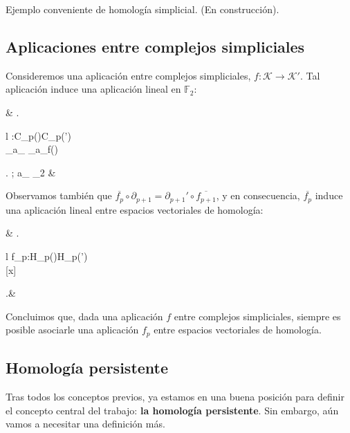 \documentclass[12pt]{article}
\numberwithin{equation}{section}
\theoremstyle{definition}
\newenvironment{ejem}
  {\pushQED{\qed}\renewcommand{\qedsymbol}{$\blacktriangleleft$}\ejemplo}
  {\popQED\endejemplo}
\theoremstyle{remark}
\theoremstyle{plain}
\begin{document}
		\begin{ejem}
			Ejemplo conveniente de homología simplicial. (En construcción).
		\end{ejem}	

	\subsection{Aplicaciones entre complejos simpliciales}

		Consideremos una aplicación entre complejos simpliciales, $f:\mathcal{K}\rightarrow\mathcal{K}'$. Tal aplicación induce una aplicación lineal en $\mathbb{F}_{2}$:
		\begin{flalign*}
			& \left.
			\begin{array}{l}
				:C_{p}()\rightarrow C_{p}(')\\[2pt] 
				\hspace{0.45cm} \displaystyle \sum_{}a_{\sigma}\sigma \mapsto 
				\displaystyle \sum_{}a_{\sigma}f(\sigma)
			\end{array}
			\right. ; \hspace{0.25cm} a_{\sigma} \in \mathbb{F}_{2} &
		\end{flalign*}
		
		Observamos también que $\overline{f_{p}}\circ\partial_{p+1}=\partial_{p+1}'\circ\overline{f_{p+1}}$, y en consecuencia, $\overline{f_{p}}$ induce una aplicación lineal
		entre espacios vectoriales de homología:	
		\begin{flalign*}
			& \left.
			\begin{array}{l}
				f_{p}:H_{p}()\rightarrow H_{p}(\mathcal{K}')\\[2pt] 
				\hspace{1.35cm} [x] \mapsto [\overline{f_{p}(x)}]
			\end{array}
			\right.&
		\end{flalign*}

		Concluimos que, dada una aplicación $f$ entre complejos simpliciales, siempre es posible asociarle una aplicación $f_{p}$ entre espacios vectoriales de homología.
	
	\subsection{Homología persistente}	
		
		Tras todos los conceptos previos, ya estamos en una buena posición para definir el concepto central del trabajo: \textbf{la homología persistente}. Sin embargo, aún
		vamos a necesitar una definición más.
\end{document}
